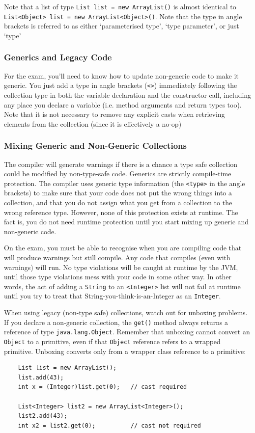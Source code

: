 Note that a list of type \verb#List list = new ArrayList()# is almost identical 
to\\ \verb#List<Object> list = new ArrayList<Object>()#. Note that the type in 
angle brackets is referred to as either `parameterised type', `type parameter', 
or just `type'

\subsubsection{Generics and Legacy Code}
For the exam, you'll need to know how to update non-generic code to make it 
generic. You just add a type in angle brackets (\verb#<>#) immediately 
following the collection type in both the variable declaration and the 
constructor call, including any place you declare a variable (i.e. method 
arguments and return types too). Note that it is not necessary to remove any 
explicit casts when retrieving elements from the collection (since it is 
effectively a no-op) 

\subsubsection{Mixing Generic and Non-Generic Collections}
The compiler will generate warnings if there is a chance a type safe collection 
could be modified by non-type-safe code. Generics are strictly compile-time 
protection. The compiler uses generic type information (the \verb#<type># in 
the angle brackets) to make sure that your code does not put the wrong things 
into a collection, and that you do not assign what you get from a collection to 
the wrong reference type. However, none of this protection exists at runtime.  
The fact is, you do not need runtime protection until you start mixing up 
generic and non-generic code.

On the exam, you must be able to recognise when you are compiling code that 
will produce warnings but still compile. Any code that compiles (even with 
warnings) will run. No type violations will be caught at runtime by the JVM, 
until those type violations mess with your code in some other way. In other 
words, the act of adding a \verb#String# to an \verb#<Integer># list will not 
fail at runtime until you try to treat that String-you-think-is-an-Integer as 
an \verb#Integer#.

When using legacy (non-type safe) collections, watch out for unboxing problems.  
If you declare a non-generic collection, the \verb#get()# method always returns 
a reference of type \verb#java.lang.Object#. Remember that unboxing cannot 
convert an \verb#Object# to a primitive, even if that \verb#Object# reference 
refers to a wrapped primitive. Unboxing converts only from a wrapper class 
reference to a primitive:
\begin{verbatim}
    List list = new ArrayList();
    list.add(43);
    int x = (Integer)list.get(0);   // cast required

    List<Integer> list2 = new ArrayList<Integer>();
    list2.add(43);
    int x2 = list2.get(0);          // cast not required
\end{verbatim}

